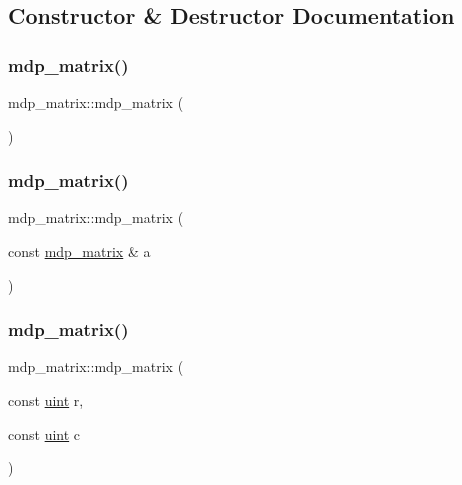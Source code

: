 \subsection{Constructor \& Destructor Documentation}
\mbox{\label{classmdp__matrix_a54b72b2aaf4630fce237604942cf6b3d}} 
\subsubsection{\texorpdfstring{mdp\+\_\+matrix()}{mdp\_matrix()}\hspace{0.1cm}{\footnotesize\ttfamily [1/4]}}
{\footnotesize\ttfamily mdp\+\_\+matrix\+::mdp\+\_\+matrix (\begin{DoxyParamCaption}{ }\end{DoxyParamCaption})}

\mbox{\label{classmdp__matrix_a8f70e8e0ad282c3f9c83ff0550eda677}} 
\subsubsection{\texorpdfstring{mdp\+\_\+matrix()}{mdp\_matrix()}\hspace{0.1cm}{\footnotesize\ttfamily [2/4]}}
{\footnotesize\ttfamily mdp\+\_\+matrix\+::mdp\+\_\+matrix (\begin{DoxyParamCaption}\item[{const \hyperlink{classmdp__matrix}{mdp\+\_\+matrix} \&}]{a }\end{DoxyParamCaption})}

\mbox{\label{classmdp__matrix_a943b6d355ac862b8592648275ba1639f}} 
\subsubsection{\texorpdfstring{mdp\+\_\+matrix()}{mdp\_matrix()}\hspace{0.1cm}{\footnotesize\ttfamily [3/4]}}
{\footnotesize\ttfamily mdp\+\_\+matrix\+::mdp\+\_\+matrix (\begin{DoxyParamCaption}\item[{const \hyperlink{mdp__global__vars_8h_a91ad9478d81a7aaf2593e8d9c3d06a14}{uint}}]{r,  }\item[{const \hyperlink{mdp__global__vars_8h_a91ad9478d81a7aaf2593e8d9c3d06a14}{uint}}]{c }\end{DoxyParamCaption})}

